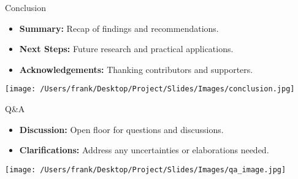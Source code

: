 \documentclass{beamer}
\begin{document}

\begin{frame}{Conclusion}
    \begin{itemize}
        \item \textbf{Summary:} Recap of findings and recommendations.
        \item \textbf{Next Steps:} Future research and practical applications.
        \item \textbf{Acknowledgements:} Thanking contributors and supporters.
    \end{itemize}
    \centering
    \texttt{[image: /Users/frank/Desktop/Project/Slides/Images/conclusion.jpg]}
\end{frame}

\begin{frame}{Q&A}
    \begin{itemize}
        \item \textbf{Discussion:} Open floor for questions and discussions.
        \item \textbf{Clarifications:} Address any uncertainties or elaborations needed.
    \end{itemize}
    \centering
    \texttt{[image: /Users/frank/Desktop/Project/Slides/Images/qa\_image.jpg]}
\end{frame}
\end{document}
